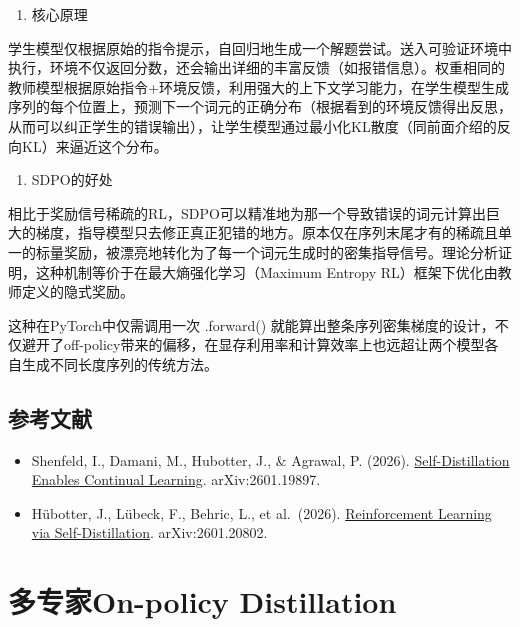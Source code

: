 \begin{enumerate}
\def\labelenumi{\arabic{enumi}.}
\setcounter{enumi}{1}
\tightlist
\item
  核心原理
\end{enumerate}

学生模型仅根据原始的指令提示，自回归地生成一个解题尝试。送入可验证环境中执行，环境不仅返回分数，还会输出详细的丰富反馈（如报错信息）。权重相同的教师模型根据原始指令+环境反馈，利用强大的上下文学习能力，在学生模型生成序列的每个位置上，预测下一个词元的正确分布（根据看到的环境反馈得出反思，从而可以纠正学生的错误输出），让学生模型通过最小化KL散度（同前面介绍的反向KL）来逼近这个分布。

\begin{enumerate}
\def\labelenumi{\arabic{enumi}.}
\setcounter{enumi}{2}
\tightlist
\item
  SDPO的好处
\end{enumerate}

相比于奖励信号稀疏的RL，SDPO可以精准地为那一个导致错误的词元计算出巨大的梯度，指导模型只去修正真正犯错的地方。原本仅在序列末尾才有的稀疏且单一的标量奖励，被漂亮地转化为了每一个词元生成时的密集指导信号。理论分析证明，这种机制等价于在最大熵强化学习（Maximum Entropy RL）框架下优化由教师定义的隐式奖励。

这种在PyTorch中仅需调用一次 .forward() 就能算出整条序列密集梯度的设计，不仅避开了off-policy带来的偏移，在显存利用率和计算效率上也远超让两个模型各自生成不同长度序列的传统方法。

\hypertarget{ux53c2ux8003ux6587ux732e-105}{%
\subsection{参考文献}\label{ux53c2ux8003ux6587ux732e-105}}

\vspace{0.25em}
\begin{itemize}
\tightlist
\item
  Shenfeld, I., Damani, M., Hubotter, J., \& Agrawal, P. (2026). \href{https://arxiv.org/abs/2601.19897}{Self-Distillation Enables Continual Learning}. arXiv:2601.19897.
\item
  Hübotter, J., Lübeck, F., Behric, L., et al.~(2026). \href{https://arxiv.org/abs/2601.20802}{Reinforcement Learning via Self-Distillation}. arXiv:2601.20802.
\end{itemize}

\clearpage

\hypertarget{ux591aux4e13ux5bb6on-policy-distillation}{%
\section{多专家On-policy Distillation}\label{ux591aux4e13ux5bb6on-policy-distillation}}

